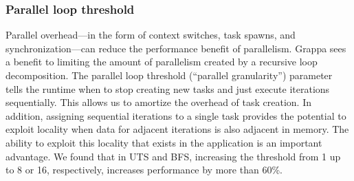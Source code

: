 




\subsubsection{Parallel loop threshold}


Parallel overhead---in the form of context switches, task spawns, and
synchronization---can reduce the performance benefit of parallelism.
Grappa sees a benefit to limiting the amount of parallelism created by
a recursive loop decomposition. The parallel loop threshold (``parallel
granularity'') parameter tells the runtime when to stop creating new tasks and just execute iterations
sequentially. This allows us to amortize the overhead of task
creation. In addition, assigning sequential iterations to a single
task provides the potential to exploit locality when data for adjacent iterations is
also adjacent in memory. The ability to exploit this locality that
exists in the application is an important advantage. We found that in UTS and BFS, increasing the
threshold from 1 up to 8 or 16, respectively, increases performance by
more than 60\%.



